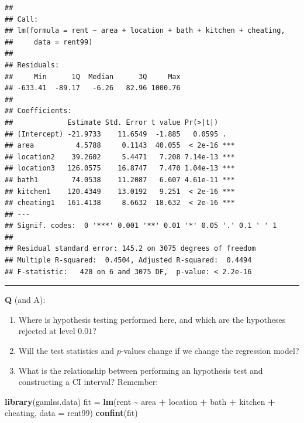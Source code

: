\documentclass[
]{article}
\newenvironment{Shaded}{\begin{snugshade}}{\end{snugshade}}
\newcommand{\AttributeTok}[1]{\textcolor[rgb]{0.13,0.29,0.53}{#1}}
\newcommand{\FunctionTok}[1]{\textcolor[rgb]{0.13,0.29,0.53}{\textbf{#1}}}
\newcommand{\NormalTok}[1]{#1}
\newcommand{\OtherTok}[1]{\textcolor[rgb]{0.56,0.35,0.01}{#1}}
\newcommand{\SpecialCharTok}[1]{\textcolor[rgb]{0.81,0.36,0.00}{\textbf{#1}}}
\providecommand{\tightlist}{%
  \setlength{\itemsep}{0pt}\setlength{\parskip}{0pt}}
\begin{document}
\begin{verbatim}
## 
## Call:
## lm(formula = rent ~ area + location + bath + kitchen + cheating, 
##     data = rent99)
## 
## Residuals:
##     Min      1Q  Median      3Q     Max 
## -633.41  -89.17   -6.26   82.96 1000.76 
## 
## Coefficients:
##             Estimate Std. Error t value Pr(>|t|)    
## (Intercept) -21.9733    11.6549  -1.885   0.0595 .  
## area          4.5788     0.1143  40.055  < 2e-16 ***
## location2    39.2602     5.4471   7.208 7.14e-13 ***
## location3   126.0575    16.8747   7.470 1.04e-13 ***
## bath1        74.0538    11.2087   6.607 4.61e-11 ***
## kitchen1    120.4349    13.0192   9.251  < 2e-16 ***
## cheating1   161.4138     8.6632  18.632  < 2e-16 ***
## ---
## Signif. codes:  0 '***' 0.001 '**' 0.01 '*' 0.05 '.' 0.1 ' ' 1
## 
## Residual standard error: 145.2 on 3075 degrees of freedom
## Multiple R-squared:  0.4504, Adjusted R-squared:  0.4494 
## F-statistic:   420 on 6 and 3075 DF,  p-value: < 2.2e-16
\end{verbatim}

\normalsize

\begin{center}\rule{0.5\linewidth}{0.5pt}\end{center}

\textbf{Q} (and A):

\begin{enumerate}
\def\labelenumi{\arabic{enumi}.}
\tightlist
\item
  Where is hypothesis testing performed here, and which are the
  hypotheses rejected at level \(0.01\)?
\item
  Will the test statistics and \(p\)-values change if we change the
  regression model?
\item
  What is the relationship between performing an hypothesis test and
  constructing a CI interval? Remember:
\end{enumerate}

\begin{Shaded}
\begin{Highlighting}[]
\FunctionTok{library}\NormalTok{(gamlss.data)}
\NormalTok{fit }\OtherTok{=} \FunctionTok{lm}\NormalTok{(rent }\SpecialCharTok{\textasciitilde{}}\NormalTok{ area }\SpecialCharTok{+}\NormalTok{ location }\SpecialCharTok{+}\NormalTok{ bath }\SpecialCharTok{+}\NormalTok{ kitchen }\SpecialCharTok{+}\NormalTok{ cheating, }\AttributeTok{data =}\NormalTok{ rent99)}
\FunctionTok{confint}\NormalTok{(fit)}
\end{Highlighting}
\end{Shaded}
\end{document}
